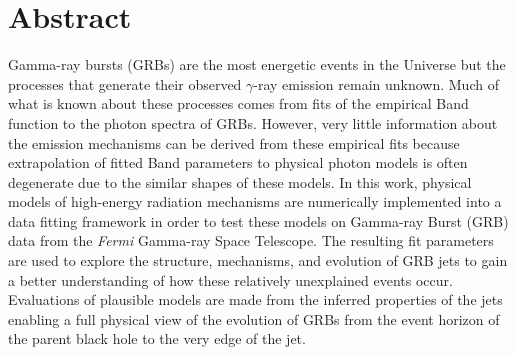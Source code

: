 \chapter*{Abstract}
\makeabstract

Gamma-ray bursts (GRBs) are the most energetic events in the Universe
but the processes that generate their observed $\gamma$-ray emission
remain unknown. Much of what is known about these processes comes from
fits of the empirical Band function to the photon spectra of
GRBs. However, very little information about the emission mechanisms
can be derived from these empirical fits because extrapolation of
fitted Band parameters to physical photon models is often degenerate
due to the similar shapes of these models.  In this work, physical
models of high-energy radiation mechanisms are numerically implemented
into a data fitting framework in order to test these models on
Gamma-ray Burst (GRB) data from the {\it Fermi} Gamma-ray Space
Telescope. The resulting fit parameters are used to explore the
structure, mechanisms, and evolution of GRB jets to gain a better
understanding of how these relatively unexplained events
occur. Evaluations of plausible models are made from the inferred
properties of the jets enabling a full physical view of the evolution
of GRBs from the event horizon of the parent black hole to the very
edge of the jet.


\abstractsig
